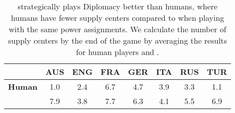 \begin{table}
\centering
\begin{tabular}{cccccccc}
 \hline
  & \textbf{AUS} & \textbf{ENG} & \textbf{FRA} & \textbf{GER} & \textbf{ITA} & \textbf{RUS} & \textbf{TUR} \\
 \hline
 \textbf{Human}&1.0&2.4&6.7&4.7&3.9&3.3&1.1\\
 \textbf{\cicero{}}&7.9&3.8&7.7&6.3&4.1&5.5&6.9\\
 \hline
\end{tabular}
\caption{\cicero{} strategically plays Diplomacy better than humans, where humans have fewer supply centers compared to \cicero{} when playing with the same power assignments. We calculate the number of supply centers by the end of the game by averaging the results for human players and \cicero{}.}
\label{tab:scs}
\end{table}